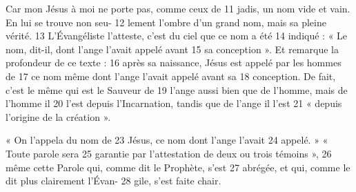 Car mon Jésus à moi ne porte pas, comme ceux de	 
11	 	jadis, un nom vide et vain. En lui se trouve non seu-	 
12	 	lement l'ombre d'un grand nom, mais sa pleine vérité.	 
13	 	L'Évangéliste l'atteste, c'est du ciel que ce nom a été	 
14	 	indiqué : « Le nom, dit-il, dont l'ange l'avait appelé avant	 
15	 	sa conception ». Et remarque la profondeur de ce texte :	 
16	 	après sa naissance, Jésus est appelé par les hommes de	 
17	 	ce nom même dont l'ange l'avait appelé avant sa	 
18	 	conception. De fait, c'est le même qui est le Sauveur de	 
19	 	l'ange aussi bien que de l'homme, mais de l'homme il	 
20	 	l'est depuis l'Incarnation, tandis que de l'ange il l'est	 
21	 	« depuis l'origine de la création ».

« On l'appela du nom de	 
23	 	Jésus, ce nom dont l'ange l'avait	 
24	 	appelé. » « Toute parole sera	 
25	 	garantie par l'attestation de deux ou trois témoins »,	 
26	 	même cette Parole qui, comme dit le Prophète, s'est	 
27	 	abrégée, et qui, comme le dit plus clairement l'Évan-	 
28	 	gile, s'est faite chair.